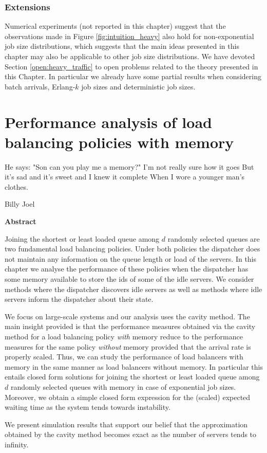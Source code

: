 \documentclass[12pt]{report}
\newenvironment{chapabstract}{%
    \begin{center}%
      \bfseries Abstract
    \end{center}}%
   {\par}
\begin{document}
\subsection*{Extensions}
Numerical experiments (not reported in this chapter) suggest that the observations made in Figure \ref{fig:intuition_heavy} also hold for non-exponential job size distributions, which suggests that the main ideas presented in this chapter may also be applicable to other job size distributions. We have devoted Section \ref{open:heavy_traffic} to open problems related to the theory presented in this Chapter. In particular we already have some partial results when considering batch arrivals, Erlang-$k$ job sizes and deterministic job sizes.

\chapter{Performance analysis of load balancing policies with memory}\label{chap:memory}
\epigraph{He says: "Son can you play me a memory?"\newline
	I'm not really sure how it goes\newline
	But it's sad and it's sweet and I knew it complete\newline
	When I wore a younger man's clothes.}{Billy Joel}

\begin{chapabstract}
Joining the shortest or least loaded queue among $d$ randomly selected queues are two 
fundamental load balancing policies. Under both policies the dispatcher does not maintain any 
information on the queue length or load of the servers. In this chapter we analyse the
performance of these policies when the dispatcher has some memory available to store
the ids of some of the idle servers. We consider methods where the dispatcher
discovers idle servers as well as methods where idle servers inform the dispatcher 
about their state.
 
We focus on large-scale systems and our analysis uses the cavity method. The main insight
provided is that the performance measures obtained via the cavity method for a load
balancing policy {\it with} memory
reduce to the performance measures for the same policy {\it without} memory provided that
the arrival rate is properly scaled. Thus, we can study the performance of load balancers
with memory in the same manner as load balancers without memory.  In particular this entails closed form solutions for joining the shortest or least loaded queue among $d$ randomly selected queues
with memory in case of exponential job sizes. Moreover, we obtain a simple closed form expression for the (scaled) expected waiting time as the system tends towards instability.

We present simulation results that support our belief that the approximation obtained by
the cavity method becomes exact as the number of servers tends to infinity. 
\end{chapabstract}
\end{document}
